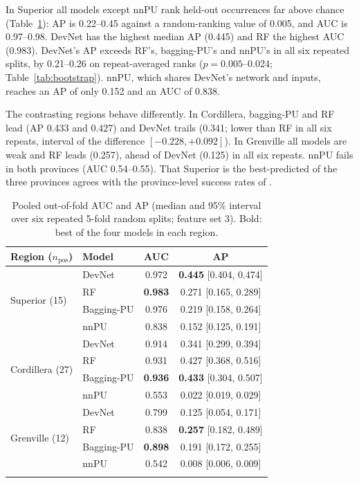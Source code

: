 \documentclass[pdflatex,sn-apa]{sn-jnl}
\begin{document}
In Superior all models except nnPU rank held-out occurrences far above chance (Table~\ref{tab:benchmark}): AP is 0.22--0.45 against a random-ranking value of 0.005, and AUC is 0.97--0.98. DevNet has the highest median AP (0.445) and RF the highest AUC (0.983). DevNet's AP exceeds RF's, bagging-PU's and nnPU's in all six repeated splits, by 0.21--0.26 on repeat-averaged ranks ($p = 0.005$--0.024; Table~\ref{tab:bootstrap}). nnPU, which shares DevNet's network and inputs, reaches an AP of only 0.152 and an AUC of 0.838.

The contrasting regions behave differently. In Cordillera, bagging-PU and RF lead (AP 0.433 and 0.427) and DevNet trails (0.341; lower than RF in all six repeats, interval of the difference $[-0.228, +0.092]$). In Grenville all models are weak and RF leads (0.257), ahead of DevNet (0.125) in all six repeats. nnPU fails in both provinces (AUC 0.54--0.55). That Superior is the best-predicted of the three provinces agrees with the province-level success rates of \citet{Parsa2024}.

\begin{table}[t]
\caption{Pooled out-of-fold AUC and AP (median and 95\% interval over six repeated 5-fold random splits; feature set 3). Bold: best of the four models in each region.}\label{tab:benchmark}
\footnotesize
\begin{tabular*}{\textwidth}{@{\extracolsep\fill}llcc}
\toprule
Region ($n_{\mathrm{pos}}$) & Model & AUC & AP \\
\midrule
\multirow{4}{*}{Superior (15)} & DevNet & 0.972 & \textbf{0.445} [0.404, 0.474] \\
 & RF & \textbf{0.983} & 0.271 [0.165, 0.289] \\
 & Bagging-PU & 0.976 & 0.219 [0.158, 0.264] \\
 & nnPU & 0.838 & 0.152 [0.125, 0.191] \\
\midrule
\multirow{4}{*}{Cordillera (27)} & DevNet & 0.914 & 0.341 [0.299, 0.394] \\
 & RF & 0.931 & 0.427 [0.368, 0.516] \\
 & Bagging-PU & \textbf{0.936} & \textbf{0.433} [0.304, 0.507] \\
 & nnPU & 0.553 & 0.022 [0.019, 0.029] \\
\midrule
\multirow{4}{*}{Grenville (12)} & DevNet & 0.799 & 0.125 [0.054, 0.171] \\
 & RF & 0.838 & \textbf{0.257} [0.182, 0.489] \\
 & Bagging-PU & \textbf{0.898} & 0.191 [0.172, 0.255] \\
 & nnPU & 0.542 & 0.008 [0.006, 0.009] \\
\botrule
\end{tabular*}
\end{table}
\end{document}
